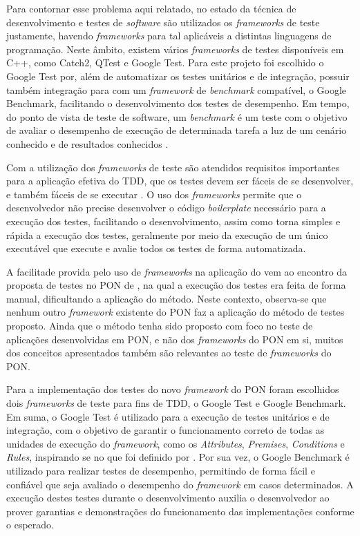 Para contornar esse problema aqui relatado, no estado da técnica de
desenvolvimento e testes de \textit{software} são utilizados os
\textit{frameworks} de teste justamente, havendo \textit{frameworks} para tal
aplicáveis a distintas linguagens de programação. Neste âmbito, existem vários
\textit{frameworks} de testes disponíveis em C++, como Catch2, QTest e Google
Test. Para este projeto foi escolhido o Google Test por, além de automatizar os
testes unitários e de integração, possuir também integração para com um
\textit{framework} de \textit{benchmark} compatível, o Google Benchmark,
facilitando o desenvolvimento dos testes de desempenho. Em tempo, do ponto de
vista de teste de software, um \textit{benchmark} é um teste com o objetivo de
avaliar o desempenho de execução de determinada tarefa a luz de um cenário
conhecido e de resultados conhecidos \cite{nambiar_2009}.

Com a utilização dos \textit{frameworks} de teste são atendidos requisitos
importantes para a aplicação efetiva do TDD, que os testes devem ser fáceis de
se desenvolver, e também fáceis de se executar \cite{google_test_primer}. O uso
dos \textit{frameworks} permite que o desenvolvedor não precise desenvolver o
código \textit{boilerplate} necessário para a execução dos testes, facilitando o
desenvolvimento, assim como torna simples e rápida a execução dos testes,
geralmente por meio da execução de um único executável que execute e avalie
todos os testes de forma automatizada. 

A facilitade provida pelo uso de \textit{frameworks} na aplicação do vem ao
encontro da proposta de testes no PON de , na qual
a execução dos testes era feita de forma manual, dificultando a aplicação do
método. Neste contexto, observa-se que nenhum outro \textit{framework} existente
do PON faz a aplicação do método de testes proposto. Ainda que o método tenha
sido proposto com foco no teste de aplicações desenvolvidas em PON, e não dos
\textit{frameworks} do PON em si, muitos dos conceitos apresentados também são
relevantes ao teste de \textit{frameworks} do PON.

Para a implementação dos testes do novo \textit{framework} do PON foram
escolhidos dois \textit{frameworks} de teste para fins de TDD, o Google Test e
Google Benchmark. Em suma, o Google Test é utilizado para a execução de testes
unitários e de integração, com o objetivo de garantir o funcionamento correto de
todas as unidades de execução do \textit{framework}, como os
\textit{Attributes}, \textit{Premises}, \textit{Conditions} e \textit{Rules},
inspirando se no que foi definido por . Por sua
vez, o Google Benchmark é utilizado para realizar testes de desempenho,
permitindo de forma fácil e confiável que seja avaliado o desempenho do
\textit{framework} em casos determinados. A execução destes testes durante o
desenvolvimento auxilia o desenvolvedor ao prover garantias e demonstrações do
funcionamento das implementações conforme o esperado.

